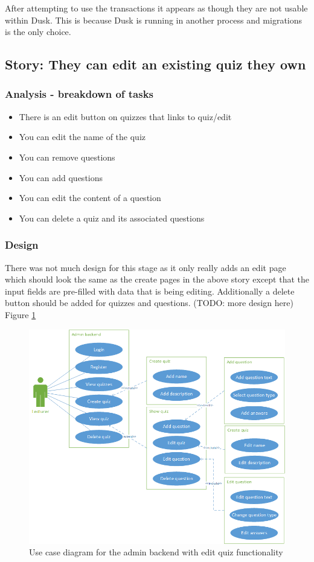 After attempting to use the transactions it appears as though they are not usable within Dusk. This is because Dusk is running in another process and migrations is the only choice\cite{dusk-transactions}. 
\newpage

\subsection{Story: They can edit an existing quiz they own}
\subsubsection{Analysis - breakdown of tasks}
\begin{itemize}
	\item There is an edit button on quizzes that links to quiz/edit
	\item You can edit the name of the quiz
	\item You can remove questions
	\item You can add questions
	\item You can edit the content of a question
	\item You can delete a quiz and its associated questions
\end{itemize}
\subsubsection{Design}
There was not much design for this stage as it only really adds an edit page which should look the same as the create pages in the above story except that the input fields are pre-filled with data that is being editing. Additionally a delete button should be added for quizzes and questions. (TODO: more design here) Figure \ref{fig:quiz-edit-use-case}
\begin{figure}
	\caption{Use case diagram for the admin backend with edit quiz functionality}
	\centerline{\includegraphics{Chapter2/Iter-2/iter-2-use-case-edit}}
	\label{fig:quiz-edit-use-case}
\end{figure}
